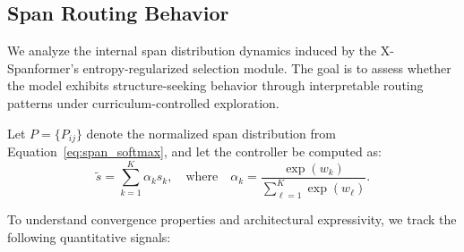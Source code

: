 \subsection{Span Routing Behavior}
\label{sec:span-behavior}

We analyze the internal span distribution dynamics induced by the X-Spanformer's entropy-regularized selection module. The goal is to assess whether the model exhibits structure-seeking behavior through interpretable routing patterns under curriculum-controlled exploration.

\vspace{0.5em}
\noindent Let \(P = \{P_{ij}\}\) denote the normalized span distribution from Equation~\eqref{eq:span_softmax}, and let the controller be computed as:
\begin{equation}
\tilde{s} = \sum_{k=1}^K \alpha_k s_k, \quad \text{where} \quad \alpha_k = \frac{\exp(w_k)}{\sum_{\ell=1}^K \exp(w_\ell)}.
\label{eq:span_behavior_controller}
\end{equation}

To understand convergence properties and architectural expressivity, we track the following quantitative signals:

